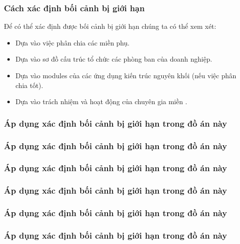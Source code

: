\subsubsection{Cách xác định bối cảnh bị giới hạn}

Để có thể xác định được bối cảnh bị giới hạn chúng ta có thể xem xét:

\begin{itemize}

\item Dựa vào việc phân chia các miền phụ.

\item Dựa vào sơ đồ cấu trúc tổ chức các phòng ban của doanh nghiệp.

\item Dựa vào modules của các ứng dụng kiến trúc nguyên khối (nếu việc phân chia tốt).

\item Dựa vào trách nhiệm và hoạt động của chuyên gia miền .

\end{itemize}

\subsubsection{Áp dụng xác định bối cảnh bị giới hạn trong đồ án này}

\subsubsection{Áp dụng xác định bối cảnh bị giới hạn trong đồ án này}

\subsubsection{Áp dụng xác định bối cảnh bị giới hạn trong đồ án này}

\subsubsection{Áp dụng xác định bối cảnh bị giới hạn trong đồ án này}

\subsubsection{Áp dụng xác định bối cảnh bị giới hạn trong đồ án này}

\subsubsection{Áp dụng xác định bối cảnh bị giới hạn trong đồ án này}

